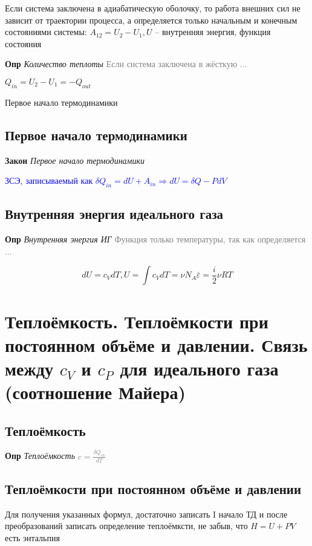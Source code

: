 \documentclass[a4paper, 14pt]{article}
\begin{document}
    Если система заключена в адиабатическую оболочку, то работа внешних сил не зависит от траектории процесса, а
    определяется только начальным и конечным состояниями системы: $A_{12} = U_2 - U_1, U$ -- внутренняя энергия,
    функция состояния

    \textbf{Опр} \textit{Количество теплоты} \textcolor{gray}{Если система заключена в жёсткую ...}

    $Q_{in} = U_2 - U_1 = -Q_{out}$

    Первое начало термодинамики

    \subsection{Первое начало термодинамики}

    \textbf{Закон} \textit{Первое начало термодинамики}

    \textcolor{blue}{ЗСЭ, записываемый как $\delta Q_{in} = dU + A_{in} \Rightarrow dU = \delta Q - PdV$}

    \subsection{Внутренняя энергия идеального газа}

    \textbf{Опр} \textit{Внутренняя энергия ИГ} \textcolor{gray}{Функция только температуры, так как определяется ...}

    \[ dU = c_V dT, U = \int c_V dT = \nu N_A \overline{\varepsilon} = \frac{i}{2} \nu RT \]

    \section{Теплоёмкость.
    Теплоёмкости при постоянном объёме и давлении.
    Связь между $c_V$ и $c_P$ для идеального газа (соотношение Майера)}

    \subsection{Теплоёмкость}

    \textbf{Опр} \textit{Теплоёмкость} \textcolor{gray}{$c = \frac{\delta Q_{in}}{dT}$}

    \subsection{Теплоёмкости при постоянном объёме и давлении}

    Для получения указанных формул, достаточно записать I начало ТД и после преобразований записать определение
    теплоёмксти, не забыв, что $H = U + PV$ есть энтальпия
\end{document}
